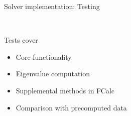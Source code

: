 \documentclass[shortpres]{beamer}
\begin{document}
\begin{frame}{Solver implementation: Testing}
	\begin{multicols}{2}
		
		\begin{figure}
			\\
		\end{figure}
		
		\columnbreak
		
		\vspace*{30pt}
		Tests cover
		\begin{itemize}
			\item Core functionality
			\item Eigenvalue computation
			\item Supplemental methods in FCalc
			\item Comparison with precomputed data
		\end{itemize}
		\vfill
	\end{multicols}
\end{frame}
\end{document}
